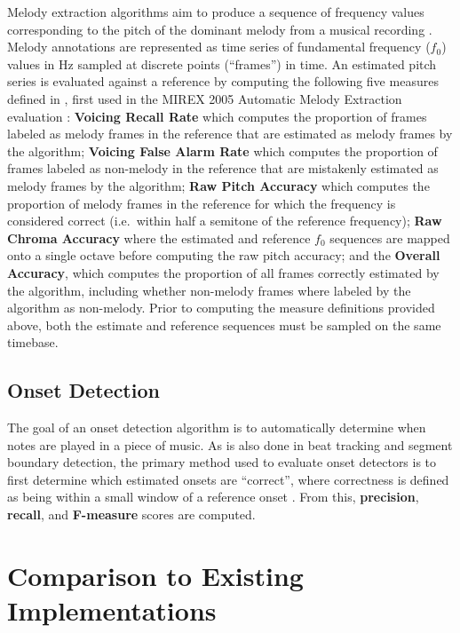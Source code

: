 \documentclass{article}
\begin{document}
Melody extraction algorithms aim to produce a sequence of frequency values corresponding to the pitch of the dominant melody from a musical recording \cite{salamon:MelodyReview:IEEESPM13}.
Melody annotations are represented as time series of fundamental frequency ($f_0$) values in Hz sampled at discrete points (``frames'') in time.
An estimated pitch series is evaluated against a reference by computing the following five measures defined in \cite{salamon:MelodyReview:IEEESPM13}, first used in the MIREX 2005 Automatic Melody Extraction evaluation \cite{polinerMelodyEval}:
\textbf{Voicing Recall Rate} which computes the proportion of frames labeled as melody frames in the reference that are estimated as melody frames by the algorithm;
\textbf{Voicing False Alarm Rate} which computes the proportion of frames labeled as non-melody in the reference that are mistakenly estimated as melody frames by the algorithm;
\textbf{Raw Pitch Accuracy} which computes the proportion of melody frames in the reference for which the frequency is considered correct (i.e.~within half a semitone of the reference frequency);
\textbf{Raw Chroma Accuracy} where the estimated and reference $f_0$ sequences are mapped onto a single octave before computing the raw pitch accuracy;
and the \textbf{Overall Accuracy}, which computes the proportion of all frames correctly estimated by the algorithm, including whether non-melody frames where labeled by the algorithm as non-melody.
Prior to computing the measure definitions provided above, both the estimate and reference sequences must be sampled on the same timebase.

\subsection{Onset Detection}

The goal of an onset detection algorithm is to automatically determine when notes are played in a piece of music.
As is also done in beat tracking and segment boundary detection, the primary method used to evaluate onset detectors is to first determine which estimated onsets are ``correct'', where correctness is defined as being within a small window of a reference onset \cite{bock2012evaluating}.
From this, \textbf{precision}, \textbf{recall}, and \textbf{F-measure} scores are computed.

\section{Comparison to Existing Implementations}
\label{sec:comparison}
\end{document}
